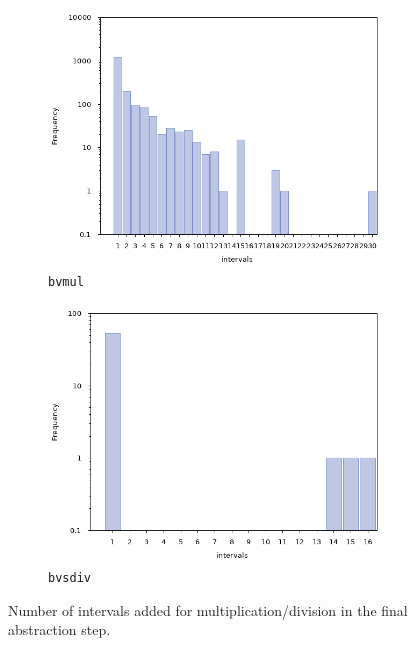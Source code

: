 \begin{figure}[ht]
    \begin{subfigure}[b]{0.5\textwidth}
        \centering
        \includegraphics[width=\textwidth]{plots/unsat/bit-MulNode.png}
        \caption{\texttt{bvmul}}
    \end{subfigure}
    \hfill
    \begin{subfigure}[b]{0.5\textwidth}
        \centering
        \includegraphics[width=\textwidth]{plots/unsat/bit-SdivNode.png}
        \caption{\texttt{bvsdiv}}
    \end{subfigure}
    \caption{Number of intervals added for multiplication/division in the final abstraction step.}
    \label{fig:evaluation:unsat:interval}
\end{figure}

